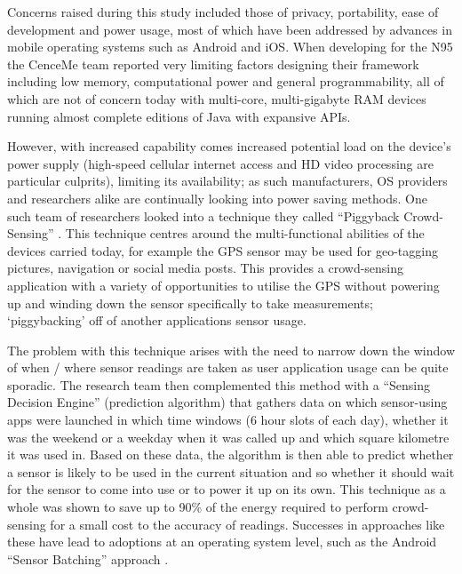 \documentclass{UoYCSproject}
\begin{document}
            Concerns raised during this study included those of privacy, portability, ease of development and power usage, most of which have been addressed by advances in mobile operating systems such as Android and iOS. When developing for the N95 the CenceMe team reported very limiting factors designing their framework including low memory, computational power and general programmability, all of which are not of concern today with multi-core, multi-gigabyte RAM devices running almost complete editions of Java with expansive APIs.
            
            However, with increased capability comes increased potential load on the device's power supply (high-speed cellular internet access and HD video processing are particular culprits), limiting its availability; as such manufacturers, OS providers and researchers alike are continually looking into power saving methods. One such team of researchers looked into a technique they called ``Piggyback Crowd-Sensing'' \citep{lane2013piggyback}. This technique centres around the multi-functional abilities of the devices carried today, for example the GPS sensor may be used for geo-tagging pictures, navigation or social media posts. This provides a crowd-sensing application with a variety of opportunities to utilise the GPS without powering up and winding down the sensor specifically to take measurements; `piggybacking' off of another applications sensor usage. 
            
            The problem with this technique arises with the need to narrow down the window of when / where sensor readings are taken as user application usage can be quite sporadic. The research team then complemented this method with a ``Sensing Decision Engine'' (prediction algorithm) that gathers data on which sensor-using apps were launched in which time windows (6 hour slots of each day), whether it was the weekend or a weekday when it was called up and which square kilometre it was used in. Based on these data, the algorithm is then able to predict whether a sensor is likely to be used in the current situation and so whether it should wait for the sensor to come into use or to power it up on its own. This technique as a whole was shown to save up to 90\% of the energy required to perform crowd-sensing for a small cost to the accuracy of readings. Successes in approaches like these have lead to adoptions at an operating system level, such as the Android ``Sensor Batching'' approach \citep{AndroidSenseBatch}.
            
\end{document}
